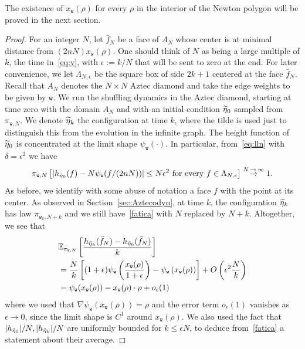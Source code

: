 \documentclass[10pt]{amsart}
\theoremstyle{definition}\newtheorem{defi}[theo]{Definition}\newtheorem{rema}[theo]{Remark}\newtheorem{exam}[theo]{Example}\newtheorem{exem}[theo]{Example}\newtheorem{nota}[theo]{Notation}
\newcommand{\ttw}{\mathtt{w}}
\newcommand{\bbE}{\mathbb{E}}
\let\oldtilde\tilde
\renewcommand*{\tilde}[1]{\mathchoice{\widetilde{#1}}{\widetilde{#1}}{\oldtilde{#1}}{\oldtilde{#1}}}
\begin{document}
The existence of $x_{\ttw}(\rho)$ for every $\rho$ in the interior of the Newton polygon will be proved in the next section.


\begin{proof}
For an integer $N$, let $\bar f_N$ be a face of $A_N$ whose center is at minimal distance from $(2nN) x_{\ttw}(\rho)$. One should think of $N$ as being a large multiple of $k$, the time in~\eqref{eq:v}, with $\epsilon:=k/N$ that will be sent to zero at the end. For later convenience, we let $\Lambda_{N,\epsilon}$ be the square box of side $2k+1$ centered at the face $\bar f_N$. Recall that $A_N$ denotes the $N\times N$ Aztec diamond and take the edge weights to be given by $\ttw$. We run the shuffling dynamics in the Aztec diamond, starting at time zero with the domain $A_N$ and with an initial condition $\tilde \eta_0$ sampled from $\pi_{\ttw,N}$. We denote $\tilde \eta_k$ the configuration at time $k$, where the tilde is used just to distinguish this from the evolution in the infinite graph. The height function of $\tilde\eta_0$ is concentrated at the limit shape $\psi_{\ttw}(\cdot)$. In particular, from~\eqref{eq:lln} with $\delta=\epsilon^2$ we have
\begin{equation}\label{fatica}
\pi_{\ttw,N} \left[\left|h_{\tilde \eta_0}(f)- N \psi_{\ttw}(f/(2nN))\right|\le N \epsilon^2 \text{ for every } f\in \Lambda_{N,\epsilon}\right]\stackrel{N\,\to\,\infty}\to1.
\end{equation}
As before, we identify with some abuse of notation a face $f$ with the point at its center. As observed in Section~\ref{sec:Aztecodyn}, at time $k$, the configuration $\tilde \eta_k$ has law $\pi_{\ttw_k,N+k}$ and we still have~\eqref{fatica} with $N$ replaced by $N+k$. Altogether, we see that
\begin{equation}\label{eq:perA}
\begin{split}
&\bbE_{\pi_{\ttw,N}}\left[\frac{ h_{\tilde \eta_k}(\bar f_N)-h_{\tilde \eta_0}(\bar f_N)}k\right]\\
&=\frac Nk\left[(1+\epsilon)\psi_{\ttw}\left(\frac{x_{\ttw}(\rho)}{1+\epsilon}\right) - \psi_{\ttw}\left(x_{\ttw}(\rho)\right)\right]+O\left(\epsilon^2 \frac Nk\right)\\
&= \psi_{\ttw}(x_{\ttw}(\rho))-x_{\ttw}(\rho)\cdot \rho+o_\epsilon(1)
\end{split}
\end{equation}
where we used that $\nabla\psi_{\ttw}(x_{\ttw}(\rho))=\rho$ and the error term $o_\epsilon(1)$ vanishes as $\epsilon\to0$, since the limit shape is $C^1$ around $x_{\mathtt w}(\rho)$. We also used the fact that $|h_{\tilde \eta_0}|/N, |h_{\tilde \eta_k}|/N$ are uniformly bounded for $k\le \epsilon N$, to deduce from~\eqref{fatica} a statement about their average.


\end{proof}
\end{document}
